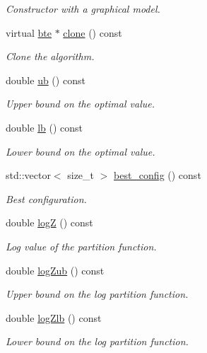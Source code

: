 \begin{DoxyCompactItemize}
\begin{DoxyCompactList}\small\item\em Constructor with a graphical model. \end{DoxyCompactList}\item 
virtual \hyperlink{classmerlin_1_1bte}{bte} $\ast$ \hyperlink{classmerlin_1_1bte_a074c1b194629f26df5a5d99102a20108}{clone} () const 
\begin{DoxyCompactList}\small\item\em Clone the algorithm. \end{DoxyCompactList}\item 
double \hyperlink{classmerlin_1_1bte_a8855426f65d43e799053282369728736}{ub} () const 
\begin{DoxyCompactList}\small\item\em Upper bound on the optimal value. \end{DoxyCompactList}\item 
double \hyperlink{classmerlin_1_1bte_ac0302ea356a59d0890e8a049c54841c0}{lb} () const 
\begin{DoxyCompactList}\small\item\em Lower bound on the optimal value. \end{DoxyCompactList}\item 
std\+::vector$<$ size\+\_\+t $>$ \hyperlink{classmerlin_1_1bte_a09a23c8791601d912bf6872f0b13510a}{best\+\_\+config} () const 
\begin{DoxyCompactList}\small\item\em Best configuration. \end{DoxyCompactList}\item 
double \hyperlink{classmerlin_1_1bte_aa57126509e1c91198c21a01854787afa}{logZ} () const 
\begin{DoxyCompactList}\small\item\em Log value of the partition function. \end{DoxyCompactList}\item 
double \hyperlink{classmerlin_1_1bte_a78cf8295cf726052647de96a8dec59ad}{log\+Zub} () const 
\begin{DoxyCompactList}\small\item\em Upper bound on the log partition function. \end{DoxyCompactList}\item 
double \hyperlink{classmerlin_1_1bte_ae3c26e3c8aedeb945f5efc78046932fb}{log\+Zlb} () const 
\begin{DoxyCompactList}\small\item\em Lower bound on the log partition function. \end{DoxyCompactList}\item 

\end{DoxyCompactItemize}
